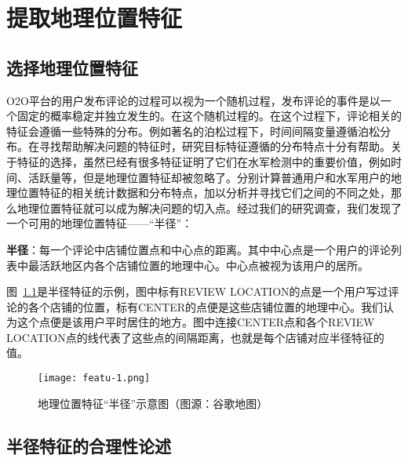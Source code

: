 
\chapter{提取地理位置特征}
\label{chap:Featu}



\section{选择地理位置特征}

O2O平台的用户发布评论的过程可以视为一个随机过程，发布评论的事件是以一个固定的概率稳定并独立发生的。在这个随机过程的。在这个过程下，评论相关的特征会遵循一些特殊的分布。例如著名的泊松过程下，时间间隔变量遵循泊松分布。在寻找帮助解决问题的特征时，研究目标特征遵循的分布特点十分有帮助。关于特征的选择，虽然已经有很多特征证明了它们在水军检测中的重要价值，例如时间、活跃量等，但是地理位置特征却被忽略了。分别计算普通用户和水军用户的地理位置特征的相关统计数据和分布特点，加以分析并寻找它们之间的不同之处，那么地理位置特征就可以成为解决问题的切入点。经过我们的研究调查，我们发现了一个可用的地理位置特征——“半径”：

\begin{defn}
	\textbf{半径}：每一个评论中店铺位置点和中心点的距离。其中中心点是一个用户的评论列表中最活跃地区内各个店铺位置的地理中心。中心点被视为该用户的居所。
\end{defn}

图~\ref{fig:radius}是半径特征的示例，图中标有REVIEW LOCATION的点是一个用户写过评论的各个店铺的位置，标有CENTER的点便是这些店铺位置的地理中心。我们认为这个点便是该用户平时居住的地方。图中连接CENTER点和各个REVIEW LOCATION点的线代表了这些点的间隔距离，也就是每个店铺对应半径特征的值。

\begin{figure}[htbp]
	\centering
	\begin{minipage}[htbp]{\textwidth}
		\centering
		\texttt{[image: featu-1.png]}
		\caption[地理位置特征“半径”示意图]
		{地理位置特征“半径”示意图（图源：谷歌地图）\label{fig:radius}}		
	\end{minipage}     
\end{figure}



\section{半径特征的合理性论述}

